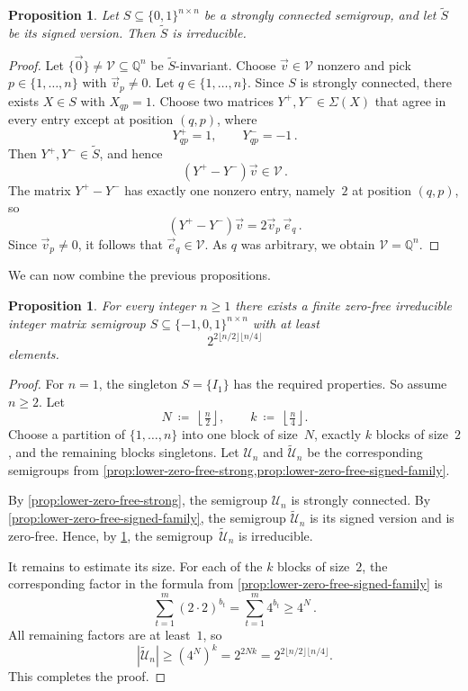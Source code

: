 \documentclass{lmcs}
\newtheorem{proposition}[thm]{Proposition}
\theoremstyle{definition}
\newcommand{\Q}{\mathbb{Q}}
\newcommand{\U}{\mathcal{U}}
\newcommand{\V}{\mathcal{V}}
\begin{document}
\begin{proposition}\label{prop:lower-zero-free-signed-irreducible}
Let $S \subseteq \{0,1\}^{n \times n}$ be a strongly connected semigroup, and let $\widetilde{S}$ be its signed version. Then $\widetilde{S}$ is irreducible.
\end{proposition}
\begin{proof}
Let $\{\vec{0}\} \ne \V \subseteq \Q^n$ be $\widetilde{S}$-invariant. Choose $\vec{v} \in \V$ nonzero and pick $p \in \{1,\ldots,n\}$ with ${\vec v}_p \ne 0$.
Let $q \in \{1,\ldots,n\}$.
Since $S$ is strongly connected, there exists $X \in S$ with $X_{q p}=1$.
Choose two matrices $Y^+,Y^- \in \Sigma(X)$ that agree in every entry except at position $(q,p)$, where
\[
  Y^+_{q p} = 1, \qquad Y^-_{q p} = -1\,.
\]
Then $Y^+,Y^- \in \widetilde{S}$, and hence
\[
  (Y^+ - Y^-) \vec{v} \in \V\,.
\]
The matrix $Y^+ - Y^-$ has exactly one nonzero entry, namely~$2$ at position $(q,p)$, so
\[
  (Y^+ - Y^-) \vec{v} = 2 {\vec v}_p \, \vec{e}_q\,.
\]
Since ${\vec v}_p \ne 0$, it follows that $\vec{e}_q \in \V$.
As $q$ was arbitrary, we obtain $\V = \Q^n$.
\end{proof}

We can now combine the previous propositions.

\begin{proposition}\label{prop:lower-zero-free}
For every integer $n \ge 1$ there exists a finite zero-free irreducible integer matrix semigroup $S \subseteq \{-1,0,1\}^{n \times n}$ with at least
\[
  2^{2 \lfloor n/2 \rfloor \lfloor n/4 \rfloor}
\]
elements.
\end{proposition}
\begin{proof}
For $n=1$, the singleton $S = \{I_1\}$ has the required properties.
So assume $n \ge 2$.
Let
\[
  N \ \coloneqq \ \left\lfloor \tfrac{n}{2} \right\rfloor,
  \qquad
  k \ \coloneqq \ \left\lfloor \tfrac{n}{4} \right\rfloor.
\]
Choose a partition of $\{1,\ldots,n\}$ into one block of size~$N$, exactly $k$ blocks of size~$2$, and the remaining blocks singletons.
Let $\U_n$ and $\widetilde{\U}_n$ be the corresponding semigroups from \cref{prop:lower-zero-free-strong,prop:lower-zero-free-signed-family}.

By \cref{prop:lower-zero-free-strong}, the semigroup $\U_n$ is strongly connected.
By \cref{prop:lower-zero-free-signed-family}, the semigroup $\widetilde{\U}_n$ is its signed version and is zero-free.
Hence, by \cref{prop:lower-zero-free-signed-irreducible}, the semigroup~$\widetilde{\U}_n$ is irreducible.

It remains to estimate its size.
For each of the $k$ blocks of size~$2$, the corresponding factor in the formula from \cref{prop:lower-zero-free-signed-family} is
\[
  \sum_{t=1}^m (2 \cdot 2)^{b_t}
  =
  \sum_{t=1}^m 4^{b_t}
  \ge
  4^N\,.
\]
All remaining factors are at least~$1$, so
\[
  |\widetilde{\U}_n|
  \ge
  (4^N)^k
  =
  2^{2 N k}
  =
  2^{2 \lfloor n/2 \rfloor \lfloor n/4 \rfloor}.
\]
This completes the proof.
\end{proof}
\end{document}
